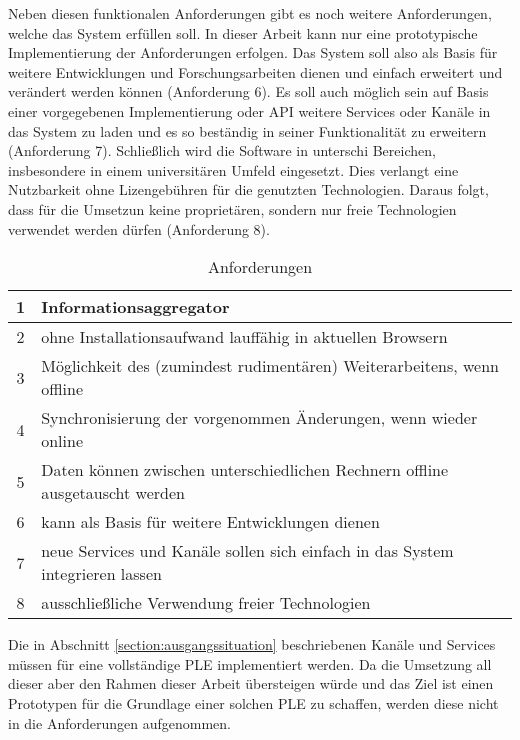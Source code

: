 Neben diesen funktionalen Anforderungen gibt es noch weitere Anforderungen, welche das System erfüllen soll. In dieser Arbeit kann nur eine prototypische Implementierung der Anforderungen erfolgen. Das System soll also als Basis für weitere Entwicklungen und Forschungsarbeiten dienen und einfach erweitert und verändert werden können (Anforderung 6). Es soll auch möglich sein auf Basis einer vorgegebenen Implementierung oder API weitere Services oder Kanäle in das System zu laden und es so beständig in seiner Funktionalität zu erweitern (Anforderung 7). Schließlich wird die Software in unterschi Bereichen, insbesondere in einem universitären Umfeld eingesetzt. Dies verlangt eine Nutzbarkeit ohne Lizengebühren für die genutzten Technologien. Daraus folgt, dass für die Umsetzun keine proprietären, sondern nur freie Technologien verwendet werden dürfen (Anforderung 8). 

\begin{table}[h]
\caption{Anforderungen}
\begin{tabular}{c || l}
1 & Informationsaggregator \\
\hline
2 & ohne Installationsaufwand lauffähig in aktuellen Browsern \\
\hline
3 & Möglichkeit des (zumindest rudimentären) Weiterarbeitens, wenn offline \\
\hline
4 & Synchronisierung der vorgenommen Änderungen, wenn wieder online \\
\hline
5 & Daten können zwischen unterschiedlichen Rechnern offline ausgetauscht werden \\
\hline
6 & kann als Basis für weitere Entwicklungen dienen\\
\hline
7 & neue Services und Kanäle sollen sich einfach in das System integrieren lassen  \\
\hline
8 & ausschließliche Verwendung freier Technologien \\
\hline
\end{tabular}
\label{table:anforderungen}
\end{table}

Die in Abschnitt \ref{section:ausgangssituation} beschriebenen Kanäle und Services müssen für eine vollständige PLE implementiert werden. Da die Umsetzung all dieser aber den Rahmen dieser Arbeit übersteigen würde und das Ziel ist einen Prototypen für die Grundlage einer solchen PLE zu schaffen, werden diese nicht in die Anforderungen aufgenommen.


